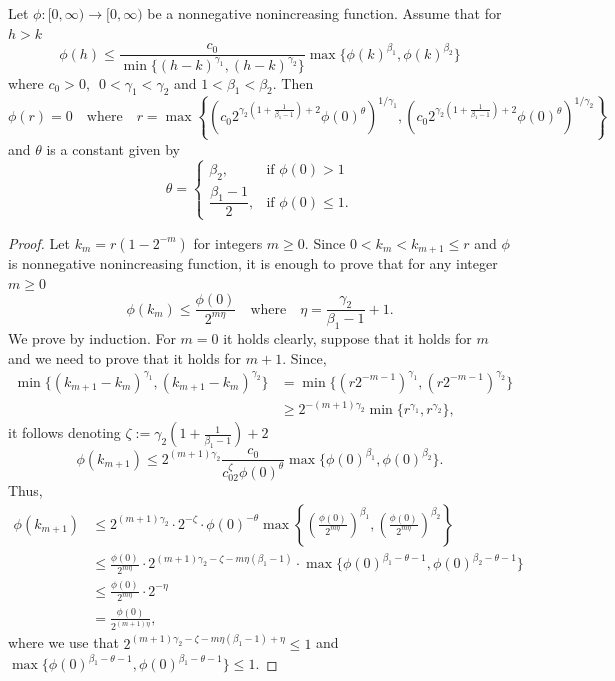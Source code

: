 \documentclass[10pt,a4paper]{amsart}
\begin{document}
\begin{lemma}\label{lemaux}
    Let $\phi:[0,\infty)\to [0,\infty)$ be a nonnegative nonincreasing function.
    Assume that for $h>k$
    $$\phi(h)\leq \frac{c_0}{\min\{(h-k)^{\gamma_1},(h-k)^{\gamma_2}\}}\max\{\phi(k)^{\beta_1},\phi(k)^{\beta_2}\}  $$
    where $c_0>0,\,\,\,0<\gamma_1<\gamma_2$ and $1<\beta_1<\beta_2.$
    Then
   $$\phi(r)=0\quad\text{where}\quad r=\max\left\{ \left(c_0 2^{\gamma_2(1+\frac{1}{\beta_1-1})+2}\phi(0)^\theta\right)^{1/\gamma_1}, \left(c_0 2^{\gamma_2(1+\frac{1}{\beta_1-1})+2}\phi(0)^\theta\right)^{1/\gamma_2} \right\}$$
   and $\theta$ is a constant given by
    $$\theta=
   \begin{cases}
    \beta_2, & \text{if } \phi(0) > 1 \\
    \dfrac{\beta_1-1}{2}, & \text{if } \phi(0) \leq 1.
   \end{cases}
    $$
\end{lemma}

\begin{proof}
   Let $k_m=r\left(1-2^{-m}\right)$ for integers $m\geq 0.$ Since $0<k_m<k_{m+1}\leq r$ and $\phi$ is nonnegative nonincreasing function, it is enough to prove that for any integer $m\geq 0$ 
   $$\phi(k_m)\leq \frac{\phi(0)}{2^{m\eta}}\quad\text{where}\quad \eta=\frac{\gamma_2}{\beta_1-1}+1.  $$
   We prove by induction. For $m=0$ it holds clearly, suppose that it holds
 for $m$ and we need to prove that it holds for $m + 1.$ 
 Since,
  \begin{align*}
      \min\{(k_{m+1}-k_m)^{\gamma_1}, (k_{m+1}-k_m)^{\gamma_2}\} &= \min\{(r2^{-m-1})^{\gamma_1}, (r2^{-m-1})^{\gamma_2}\}\\
      &\geq 2^{-(m+1)\gamma_2}\min\{r^{\gamma_1}, r^{\gamma_2}\},
  \end{align*}
 it follows denoting $\zeta:=\gamma_2\left(1+ \frac{1}{\beta_1-1}\right)+2$
 $$\phi(k_{m+1}) \leq 2^{(m+1)\gamma_2}\frac{c_0}{c_02^\zeta\phi(0)^\theta}\max\{\phi(0)^{\beta_1},\phi(0)^{\beta_2}\}.$$
 Thus,
 \begin{align*}
     \phi(k_{m+1}) &\leq 2^{(m+1)\gamma_2}\cdot 2^{-\zeta}\cdot\phi(0)^{-\theta}\max\left\{\left(\frac{\phi(0)}{2^{m\eta}}\right)^{\beta_1}, \left(\frac{\phi(0)}{2^{m\eta}}\right)^{\beta_2}\right\}\\
     &\leq \frac{\phi(0)}{2^{m\eta}}\cdot 2^{(m+1)\gamma_2-\zeta-m\eta(\beta_1-1)}\cdot\max\{\phi(0)^{\beta_1-\theta-1}, \phi(0)^{\beta_2-\theta-1}\}\\
     &\leq \frac{\phi(0)}{2^{m\eta}}\cdot 2^{-\eta}\\
     &= \frac{\phi(0)}{2^{(m+1)\eta}},
 \end{align*}
 where we use that $2^{(m+1)\gamma_2-\zeta-m\eta(\beta_1-1)+\eta}\leq 1$ and $\max\{\phi(0)^{\beta_1-\theta-1}, \phi(0)^{\beta_1-\theta-1}\}\leq 1.$
\end{proof}
\end{document}

